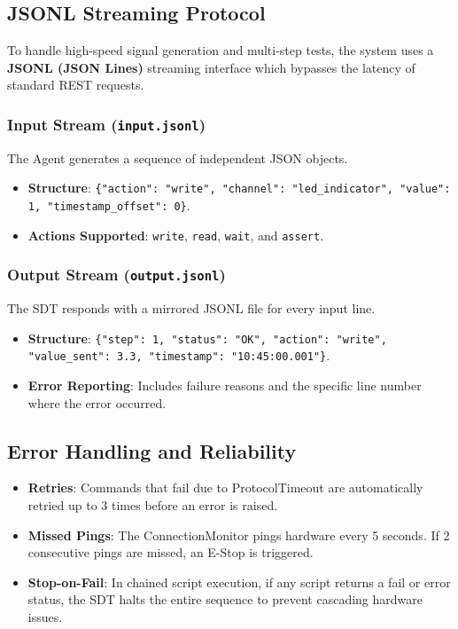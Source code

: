 \documentclass[conference]{IEEEtran}
\begin{document}
\subsection{JSONL Streaming Protocol}
To handle high-speed signal generation and multi-step tests, the system uses a \textbf{JSONL (JSON Lines)} streaming interface which bypasses the latency of standard REST requests.
\subsubsection{Input Stream (\texttt{input.jsonl})}
The Agent generates a sequence of independent JSON objects.
\begin{itemize}
    \item \textbf{Structure}: \texttt{\{"action": "write", "channel": "led\_indicator", "value": 1, "timestamp\_offset": 0\}}.
    \item \textbf{Actions Supported}: \texttt{write}, \texttt{read}, \texttt{wait}, and \texttt{assert}.
\end{itemize}
\subsubsection{Output Stream (\texttt{output.jsonl})}
The SDT responds with a mirrored JSONL file for every input line.
\begin{itemize}
    \item \textbf{Structure}: \texttt{\{"step": 1, "status": "OK", "action": "write", "value\_sent": 3.3, "timestamp": "10:45:00.001"\}}.
    \item \textbf{Error Reporting}: Includes failure reasons and the specific line number where the error occurred.
\end{itemize}

\subsection{Error Handling and Reliability}
\begin{itemize}
    \item \textbf{Retries}: Commands that fail due to ProtocolTimeout are automatically retried up to 3 times before an error is raised.
    \item \textbf{Missed Pings}: The ConnectionMonitor pings hardware every 5 seconds. If 2 consecutive pings are missed, an E-Stop is triggered.
    \item \textbf{Stop-on-Fail}: In chained script execution, if any script returns a fail or error status, the SDT halts the entire sequence to prevent cascading hardware issues.
\end{itemize}
\end{document}

